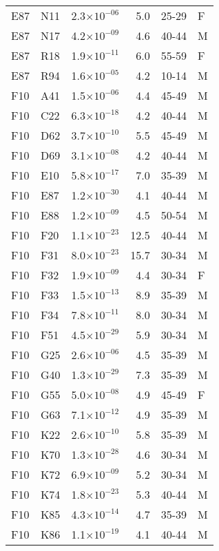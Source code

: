 \begin{longtable}{lllrll}
   E87 & N11 & 2.3$\times10^{-06}$ & 5.0 & 25-29 & F \\ 
   E87 & N17 & 4.2$\times10^{-09}$ & 4.6 & 40-44 & M \\ 
   E87 & R18 & 1.9$\times10^{-11}$ & 6.0 & 55-59 & F \\ 
   E87 & R94 & 1.6$\times10^{-05}$ & 4.2 & 10-14 & M \\ 
   F10 & A41 & 1.5$\times10^{-06}$ & 4.4 & 45-49 & M \\ 
   F10 & C22 & 6.3$\times10^{-18}$ & 4.2 & 40-44 & M \\ 
   F10 & D62 & 3.7$\times10^{-10}$ & 5.5 & 45-49 & M \\ 
   F10 & D69 & 3.1$\times10^{-08}$ & 4.2 & 40-44 & M \\ 
   F10 & E10 & 5.8$\times10^{-17}$ & 7.0 & 35-39 & M \\ 
   F10 & E87 & 1.2$\times10^{-30}$ & 4.1 & 40-44 & M \\ 
   F10 & E88 & 1.2$\times10^{-09}$ & 4.5 & 50-54 & M \\ 
   F10 & F20 & 1.1$\times10^{-23}$ & 12.5 & 40-44 & M \\ 
   F10 & F31 & 8.0$\times10^{-23}$ & 15.7 & 30-34 & M \\ 
   F10 & F32 & 1.9$\times10^{-09}$ & 4.4 & 30-34 & F \\ 
   F10 & F33 & 1.5$\times10^{-13}$ & 8.9 & 35-39 & M \\ 
   F10 & F34 & 7.8$\times10^{-11}$ & 8.0 & 30-34 & M \\ 
   F10 & F51 & 4.5$\times10^{-29}$ & 5.9 & 30-34 & M \\ 
   F10 & G25 & 2.6$\times10^{-06}$ & 4.5 & 35-39 & M \\ 
   F10 & G40 & 1.3$\times10^{-29}$ & 7.3 & 35-39 & M \\ 
   F10 & G55 & 5.0$\times10^{-08}$ & 4.9 & 45-49 & F \\ 
   F10 & G63 & 7.1$\times10^{-12}$ & 4.9 & 35-39 & M \\ 
   F10 & K22 & 2.6$\times10^{-10}$ & 5.8 & 35-39 & M \\ 
   F10 & K70 & 1.3$\times10^{-28}$ & 4.6 & 30-34 & M \\ 
   F10 & K72 & 6.9$\times10^{-09}$ & 5.2 & 30-34 & M \\ 
   F10 & K74 & 1.8$\times10^{-23}$ & 5.3 & 40-44 & M \\ 
   F10 & K85 & 4.3$\times10^{-14}$ & 4.7 & 35-39 & M \\ 
   F10 & K86 & 1.1$\times10^{-19}$ & 4.1 & 40-44 & M \\ 

\end{longtable}
